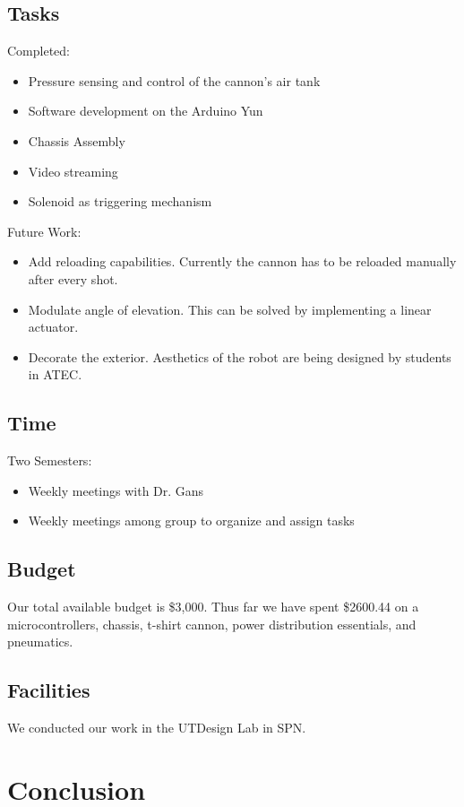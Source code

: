 \documentclass[letterpaper,12pt]{article}
\begin{document}
\subsection{Tasks}
Completed:
\begin{itemize}
\item Pressure sensing and control of the cannon's air tank
\item Software development on the Arduino Yun
\item Chassis Assembly
\item Video streaming
\item Solenoid as triggering mechanism
\end{itemize}

Future Work:
\begin{itemize}
    \item Add reloading capabilities. Currently the cannon has to be reloaded
        manually after every shot.
    \item Modulate angle of elevation. This can be solved by implementing
        a linear actuator.
    \item Decorate the exterior. Aesthetics of the robot are being designed by
        students in ATEC.
\end{itemize}

\subsection{Time}
Two Semesters:
\begin{itemize}
    \item Weekly meetings with Dr. Gans
    \item Weekly meetings among group to organize and assign tasks
\end{itemize}

\subsection{Budget}

Our total available budget is \$3,000. Thus far we have spent \$2600.44 on
a microcontrollers, chassis, t-shirt cannon, power distribution essentials, and
pneumatics.

\subsection{Facilities}
We conducted our work in the UTDesign Lab in SPN.

\section{Conclusion}
\label{sec:conclusion}
\end{document}
